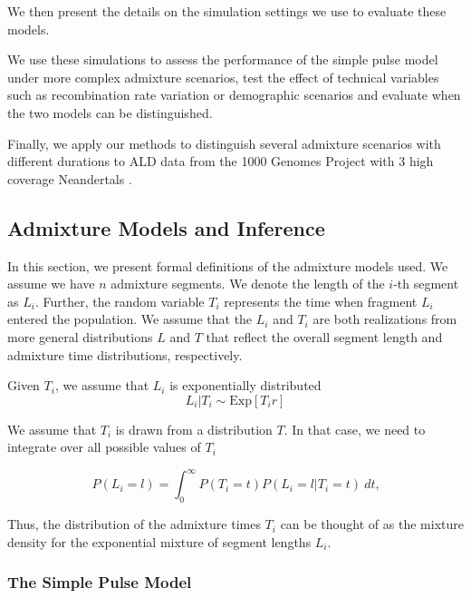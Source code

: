 \documentclass[]{article}
\begin{document}
We then present the details on the simulation settings we use to evaluate these models.

We use these simulations to assess the performance of the simple pulse model under more complex admixture scenarios, test the effect of technical variables such as recombination rate variation or demographic scenarios and evaluate when the two models can be distinguished.

Finally, we apply our methods to distinguish several admixture scenarios with different durations to ALD data from the 1000 Genomes Project \citep{the_1000_genomes_project_consortium_global_2015} with 3 high coverage Neandertals \citep{prufer_complete_2013,prufer_high-coverage_2017,mafessoni_high_coverage_2020}.


\subsection{Admixture Models and Inference}\label{admixture models}

In this section, we present formal definitions of the admixture models used.  We assume we have $n$ admixture segments. We denote the length of the $i$-th segment as $L_i$. Further, the random variable $T_i$ represents the time when fragment $L_i$ entered the population. We assume that the $L_i$ and $T_i$ are both realizations from more general distributions $L$ and $T$ that reflect the overall segment length and admixture time distributions, respectively. 

Given $T_i$, we assume that $L_i$ is exponentially distributed
\begin{equation}
    L_i|T_i \sim \text{Exp}[T_i r]
\end{equation}

We assume that  $T_i$ is drawn from a distribution $T$. In that case, we need to integrate over all possible values of $T_i$

\begin{equation}
\label{eq:standard_likelihood_definintion}
    P(L_i=l)=\int_{0}^{\infty} P(T_i=t) P(L_i=l | T_i=t) \ dt \text{,}
\end{equation}


Thus, the distribution of the admixture times $T_i$ can be thought of as the mixture density for the exponential mixture of segment lengths $L_i$. 

\subsubsection{The Simple Pulse Model}\label{The Simple Pulse Model}
\end{document}

